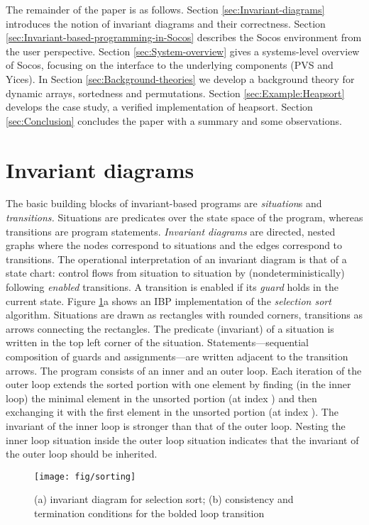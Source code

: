 \documentclass[english,submission]{eptcs}
\begin{document}
The remainder of the paper is as follows. Section \ref{sec:Invariant-diagrams}
introduces the notion of invariant diagrams and their correctness.
Section \ref{sec:Invariant-based-programming-in-Socos} describes
the Socos environment from the user perspective. Section \ref{sec:System-overview}
gives a systems-level overview of Socos, focusing on the interface
to the underlying components (PVS and Yices). In Section \ref{sec:Background-theories}
we develop a background theory for dynamic arrays, sortedness and
permutations. Section \ref{sec:Example:Heapsort} develops the case
study, a verified implementation of heapsort. Section \ref{sec:Conclusion}
concludes the paper with a summary and some observations.


\section{Invariant diagrams\label{sec:Invariant-diagrams}}

The basic building blocks of invariant-based programs are
\emph{situation}s and \emph{transitions.} Situations are predicates
over the state space of the program, whereas transitions are program
statements.  \emph{Invariant diagrams} are directed, nested graphs
where the nodes correspond to situations and the edges correspond to
transitions. The operational interpretation of an invariant diagram is
that of a state chart: control flows from situation to situation by
(nondeterministically) following \emph{enabled }transitions. A
transition is enabled if its \emph{guard }holds in the current state.
Figure \ref{fig:Sorting}a shows an IBP implementation of the
\emph{selection sort} algorithm. Situations are drawn as rectangles
with rounded corners, transitions as arrows connecting the rectangles.
The predicate (invariant) of a situation is written in the top left
corner of the situation. Statements---sequential composition of guards
and assignments---are written adjacent to the transition arrows. The
program consists of an inner and an outer loop. Each iteration of the
outer loop extends the sorted portion with one element by finding (in
the inner loop) the minimal element in the unsorted portion (at index
) and then exchanging it with the first element in the unsorted
portion (at index ). The invariant of the inner loop is stronger
than that of the outer loop. Nesting the inner loop situation inside
the outer loop situation indicates that the invariant of the outer
loop should be inherited.
\begin{figure}
\noindent \begin{centering}
\texttt{[image: fig/sorting]}
\par\end{centering}

\caption{(a) invariant diagram for selection sort; (b) consistency and termination
conditions for the bolded loop transition\label{fig:Sorting}}
\end{figure}
\end{document}
